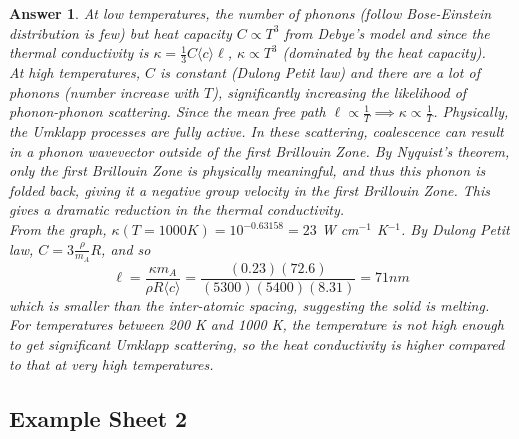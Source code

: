 \documentclass[a4paper]{article}
\newtheorem{ans}{Answer}[section]
\theoremstyle{new}
\begin{document}
\begin{ans}
At low temperatures, the number of phonons (follow Bose-Einstein distribution is few) but heat capacity $C\propto T^3$ from Debye's model and since the thermal conductivity is $\kappa=\frac{1}{3}C\langle c\rangle\ell$, $\kappa\propto T^3$ (dominated by the heat capacity).\\[5pt]
At high temperatures, $C$ is constant (Dulong Petit law) and there are a lot of phonons (number increase with $T$), significantly increasing the likelihood of phonon-phonon scattering. Since the mean free path $\ell\propto\frac{1}{T}\implies\kappa\propto\frac{1}{T}$. Physically, the Umklapp processes are fully active. In these scattering, coalescence can result in a phonon wavevector outside of the first Brillouin Zone. By Nyquist's theorem, only the first Brillouin Zone is physically meaningful, and thus this phonon is folded back, giving it a negative group velocity in the first Brillouin Zone. This gives a dramatic reduction in the thermal conductivity.\\[5pt]
From the graph, $\kappa(T=1000K)=10^{-0.63158}=23$ W cm$^{-1}$ K$^{-1}$. By Dulong Petit law, $C=3\frac{\rho}{m_A}R$, and so
$$\ell=\frac{\kappa m_A}{\rho R\langle c\rangle}=\frac{(0.23)(72.6)}{(5300)(5400)(8.31)}=71 nm$$
which is smaller than the inter-atomic spacing, suggesting the solid is melting.\\[5pt]
For temperatures between 200 K and 1000 K, the temperature is not high enough to get significant Umklapp scattering, so the heat conductivity is higher compared to that at very high temperatures.
\end{ans}
\newpage
\subsection{Example Sheet 2}
\end{document}
